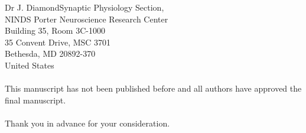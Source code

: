 \documentclass[usebwarms,a4paper,nofold]{damtplet}
\begin{document}
\begin{letter}{Dr J. Diamond}{Synaptic Physiology Section, \\ NINDS
Porter Neuroscience Research Center \\
Building 35, Room 3C-1000 \\
35 Convent Drive, MSC 3701  \\
Bethesda, MD 20892-370 \\
United States}
{   \\ \\This manuscript has not been published before and all authors have approved the final manuscript.
   \\\\Thank you in advance for your consideration.
}

\end{letter}
\end{document}
